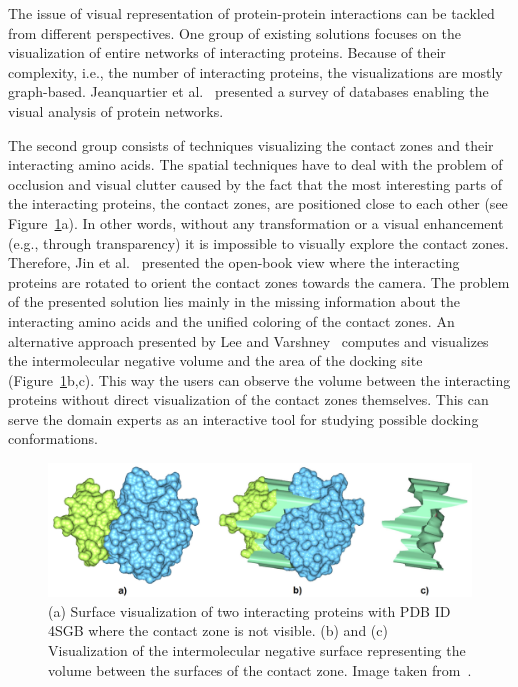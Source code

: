 \documentclass[journal]{vgtc}                %
\begin{document}
The issue of visual representation of protein-protein interactions can be tackled from different perspectives.
One group of existing solutions focuses on the visualization of entire networks of interacting proteins.
Because of their complexity, i.e., the number of interacting proteins, the visualizations are mostly graph-based.
Jeanquartier et al.~\cite{Jeanquartier2015} presented a survey of databases enabling the visual analysis of protein networks.

The second group consists of techniques visualizing the contact zones and their interacting amino acids.
The spatial techniques have to deal with the problem of occlusion and visual clutter caused by the fact that the most interesting parts of the interacting proteins, the contact zones, are positioned close to each other (see Figure~\ref{fig:varshney}a).
In other words, without any transformation or a visual enhancement (e.g., through transparency) it is impossible to visually explore the contact zones.
Therefore, Jin et al.~\cite{Jin2014} presented the open-book view where the interacting proteins are rotated to orient the contact zones towards the camera.
The problem of the presented solution lies mainly in the missing information about the interacting amino acids and the unified coloring of the contact zones.
An alternative approach presented by Lee and Varshney~\cite{Varshney2003} computes and visualizes the intermolecular negative volume and the area of the docking site (Figure~\ref{fig:varshney}b,c).
This way the users can observe the volume between the interacting proteins without direct visualization of the contact zones themselves.
This can serve the domain experts as an interactive tool for studying possible docking conformations.

\begin{figure}[bt]
  \centering
  \includegraphics[width=1.0\columnwidth]{varshney.png}
  \caption{(a) Surface visualization of two interacting proteins with PDB ID 4SGB where the contact zone is not visible. (b) and (c) Visualization of the intermolecular negative surface representing the volume between the surfaces of the contact zone. Image taken from~\cite{Varshney2003}.}
  \label{fig:varshney}
\end{figure}
\end{document}
